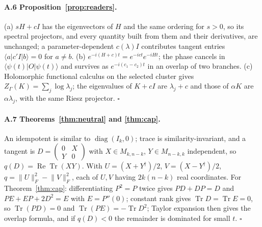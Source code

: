 \documentclass[11pt]{article}
\theoremstyle{definition}
\newcommand{\Tr}{\operatorname{Tr}}
\newcommand{\F}[1]{\lVert #1\rVert_F}
\begin{document}
\paragraph{A.6 Proposition~\ref{prop:readers}.} (a) $sH+cI$ has the eigenvectors of $H$ and the same ordering for $s>0$, so its spectral projectors, and every quantity built from them and their derivatives, are unchanged; a parameter-dependent $c(\lambda)I$ contributes tangent entries $\langle a|c'I|b\rangle=0$ for $a\ne b$. (b) $e^{-i(H+c)t}=e^{-ict}e^{-iHt}$; the phase cancels in $\langle\psi(t)|O|\psi(t)\rangle$ and survives as $e^{-i(c_1-c_2)t}$ in an overlap of two branches. (c) Holomorphic functional calculus on the selected cluster gives $Z_\Gamma(K)=\sum_j\log\lambda_j$; the eigenvalues of $K+cI$ are $\lambda_j+c$ and those of $\alpha K$ are $\alpha\lambda_j$, with the same Riesz projector. $\square$

\paragraph{A.7 Theorems~\ref{thm:neutral} and \ref{thm:cap}.} An idempotent is similar to $\operatorname{diag}(I_k,0)$; trace is similarity-invariant, and a tangent is $D=\begin{pmatrix}0&X\\Y&0\end{pmatrix}$ with $X\in M_{k,n-k}$, $Y\in M_{n-k,k}$ independent, so $q(D)=\operatorname{Re}\Tr(XY)$. With $U=(X+Y^\dagger)/2$, $V=(X-Y^\dagger)/2$, $q=\F{U}^2-\F{V}^2$, each of $U,V$ having $2k(n-k)$ real coordinates. For Theorem~\ref{thm:cap}: differentiating $P^2=P$ twice gives $PD+DP=D$ and $PE+EP+2D^2=E$ with $E=P''(0)$; constant rank gives $\Tr D=\Tr E=0$, so $\Tr(PD)=0$ and $\Tr(PE)=-\Tr D^2$; Taylor expansion then gives the overlap formula, and if $q(D)<0$ the remainder is dominated for small $t$. $\square$
\end{document}
